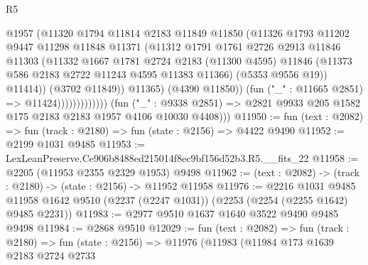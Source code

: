 \begin{lexlean}{R5}
\begin{coremodule}
                                    @1957
                                    (@11320
                                      @1794
                                      @11814
                                      @2183
                                      @11849
                                      @11850
                                      (@11326
                                        @1793
                                        @11202
                                        @9447
                                        @11298
                                        @11848
                                        @11371
                                        (@11312
                                          @1791
                                          @1761
                                          @2726
                                          @2913
                                          @11846
                                          @11303
                                          (@11332
                                            @1667
                                            @1781
                                            @2724
                                            @2183
                                            (@11300 @4595)
                                            @11846
                                            (@11373 @586 @2183 @2722 @11243 @4595 @11383 @11366)
                                            (@5353 @9556 @19))
                                          @11414))
                                      (@3702 @11849))
                                    @11365)
                                  (@4390 @11850))
                                (fun ("_" : @11665 @2851) => @11424)))))))))))))
        (fun ("_" : @9338 @2851) =>
        @2821 @9933 @205 @1582 @175 @2183 @2183 @1957 @4106 @10030 @4408)))
@11950 := fun (text : @2082) => fun (track : @2180) => fun (state : @2156) => @4422 @9490
@11952 := @2199 @1031 @9485
@11953 := LexLeanPreserve.Ce906b8488ed215014f8ec9bf156d52b3.R5.__fits_22
@11958 := @2205 (@11953 @2355 @2329 @1953) @9498
@11962 := (text : @2082) -> (track : @2180) -> (state : @2156) -> @11952 @11958
@11976 := @2216
    @1031
    @9485
    @11958
    @1642
    @9510
    (@2237 (@2247 @1031))
    (@2253 (@2254 (@2255 @1642) @9485 @2231))
@11983 := @2977 @9510 @1637 @1640 @3522 @9490 @9485 @9498
@11984 := @2868 @9510
@12029 := fun (text : @2082) =>
  fun (track : @2180) =>
  fun (state : @2156) =>
  @11976
    (@11983
      (@11984
        @173
        @1639
        @2183
        @2724
        @2733

\end{coremodule}
\end{lexlean}
